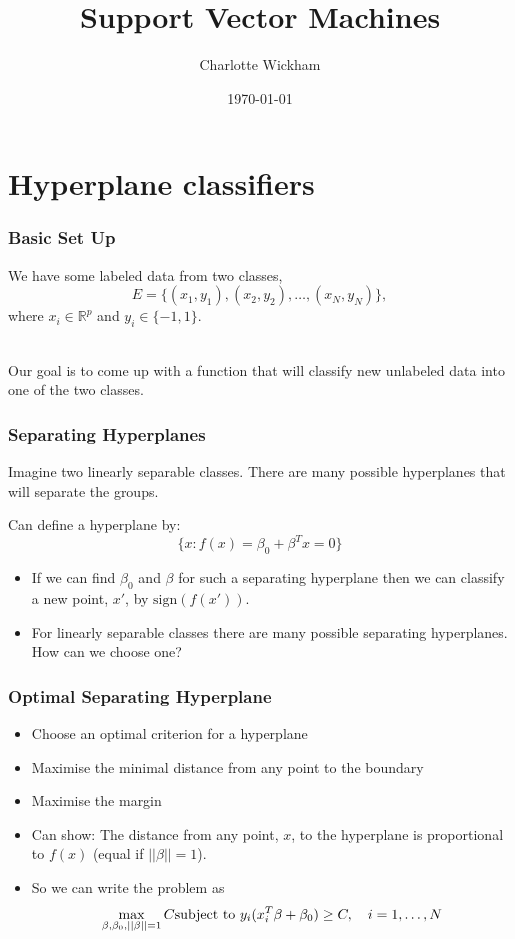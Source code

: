 \documentclass{beamer}
\title{Support Vector Machines}
\author{Charlotte Wickham}
\date{\today}
\begin{document}
\frame{\titlepage}

\section[Outline]{ 	}
\frame{\tableofcontents}

\section{Hyperplane classifiers}


\begin{frame}
	\frametitle{Basic Set Up}
	We have some labeled data from two classes,
	\[
	E = \{(x_1,y_1), (x_2, y_2), \ldots, (x_N, y_N) \},
	\]
	where $x_i\in \mathbb{R}^p$ and $y_i \in \{-1,1\}$.

	\\[14pt]
	Our goal is to come up with a function that will classify new unlabeled data into one of the two classes.
\end{frame}

\begin{frame}
	\frametitle{Separating Hyperplanes}
	Imagine two linearly separable classes.  There are many possible hyperplanes that will separate the groups.
	
	Can define a hyperplane by: 
	\[
	\{x: f(x) = \beta_0 + \beta^Tx = 0\}
	\]
	\begin{itemize}
		\item If we can find $\beta_0$ and $\beta$ for such a separating hyperplane then we can classify a new point, $x'$, by $\text{sign}(f(x'))$.
		\item For linearly separable classes there are many possible separating hyperplanes. How can we choose one?
	 \end{itemize}
\end{frame}

\begin{frame}
	\frametitle{Optimal Separating Hyperplane}
	\begin{itemize}
	\item Choose an optimal criterion for a hyperplane
	\item Maximise the minimal distance from any point to the boundary
	\item Maximise the margin
	\item Can show:
	The distance from any point, $x$, to the hyperplane is proportional to $f(x)$ (equal if $||\beta||=1$).
	\item So we can write the problem as
	\begin{equation*}
	\max_{\beta, \beta_0, ||\beta||=1} C \\
	\text{subject to } y_i(x_i^T\beta + \beta_0) \ge C, \quad i = 1,\ldots, N
	\end{equation*}
	\end{itemize}
\end{frame}
\end{document}
